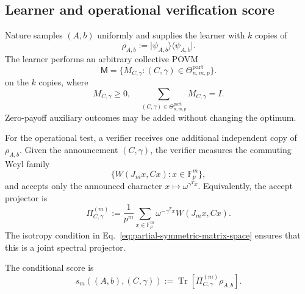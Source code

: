\documentclass[11pt]{article}
\newcommand{\F}{\mathbb F}
\newcommand{\Tr}{\operatorname{Tr}}
\newcommand{\1}{\mathbf 1}
\newcommand{\ket}[1]{\lvert #1\rangle}
\newcommand{\bra}[1]{\langle #1\rvert}
\theoremstyle{plain}
\theoremstyle{definition}
\theoremstyle{remark}
\begin{document}
\subsection{Learner and operational verification score}
\label{subsec:partial-learning-protocol}

Nature samples $(A,b)$ uniformly and supplies the learner with $k$ copies of
\begin{equation}
 \rho_{A,b}:=\ket{\psi_{A,b}}\!\bra{\psi_{A,b}}.
 \label{eq:partial-input-state}
\end{equation}
The learner performs an arbitrary collective POVM
\begin{equation}
 \mathsf M
 =\{M_{C,\gamma}:(C,\gamma)\in
       \Theta_{n,m,p}^{\mathrm{part}}\}.
 \label{eq:partial-learning-POVM}
\end{equation}
on the $k$ copies, where
\begin{equation}
 M_{C,\gamma}\geq0,
 \quad
 \sum_{(C,\gamma)\in\Theta_{n,m,p}^{\mathrm{part}}}
 M_{C,\gamma}=I.
 \label{eq:partial-learning-POVM-normalization}
\end{equation}
Zero-payoff auxiliary outcomes may be added without changing the optimum.

For the operational test, a verifier receives one additional independent copy
of $\rho_{A,b}$.  Given the announcement $(C,\gamma)$, the verifier measures
the commuting Weyl family
\begin{equation}
 \{W(J_mx,Cx):x\in\F_p^m\},
 \label{eq:partial-announced-Weyl-family}
\end{equation}
and accepts only the announced character
$x\mapsto\omega^{\gamma^Tx}$.  Equivalently, the accept projector is
\begin{equation}
 \Pi_{C,\gamma}^{(m)}
 :=\frac{1}{p^m}\sum_{x\in\F_p^m}
   \omega^{-\gamma^Tx}W(J_mx,Cx).
 \label{eq:partial-accept-projector}
\end{equation}
The isotropy condition in Eq.~\eqref{eq:partial-symmetric-matrix-space} ensures that this
is a joint spectral projector.

The conditional score is
\begin{equation}
 s_m((A,b),(C,\gamma))
 :=\Tr\!\left[\Pi_{C,\gamma}^{(m)}\rho_{A,b}\right].
 \label{eq:partial-score-definition}
\end{equation}
\end{document}
